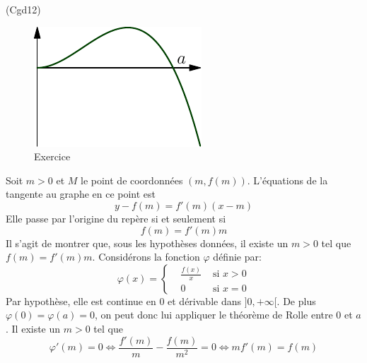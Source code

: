 \begin{tiny}(Cgd12)\end{tiny}

\begin{figure}[h!]
 \centering
 \includegraphics{./Cgd12_1.pdf}
 \caption{Exercice \theenumi}
 \label{fig:Cdg12_1}
\end{figure}

 Soit $m>0$ et $M$ le point de coordonnées $(m,f(m))$. L'équations de la tangente au graphe en ce point est
\begin{displaymath}
 y-f(m) = f'(m)(x-m)
\end{displaymath}
Elle passe par l'origine du repère si et seulement si 
\begin{displaymath}
f(m)=f'(m)m  
\end{displaymath}
Il s'agit de montrer que, sous les hypothèses données, il existe un $m>0$ tel que $f(m)=f'(m)m$.\newline
Considérons la fonction $\varphi$ définie par:
\begin{displaymath}
 \varphi(x)=
\left\lbrace 
\begin{aligned}
 &\frac{f(x)}{x} &\text{ si } x>0 \\
 &0 &\text{ si } x=0
\end{aligned}
\right. 
\end{displaymath}
Par hypothèse, elle est continue en $0$ et dérivable dans $]0,+\infty[$. De plus $\varphi(0)=\varphi(a)=0$, on peut donc lui appliquer le théorème de Rolle entre $0$ et $a$. Il existe un $m>0$ tel que
\begin{displaymath}
 \varphi'(m)=0\Leftrightarrow 
\frac{f'(m)}{m}-\frac{f(m)}{m^2}=0
\Leftrightarrow mf'(m)=f(m)
\end{displaymath}

